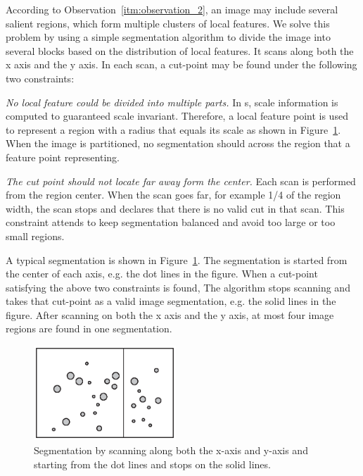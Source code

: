 According to Observation~\ref{itm:observation_2}, an image may include several salient regions, which form multiple clusters of local features. We solve this problem by using a simple segmentation algorithm to divide the image into several blocks based on the distribution of local features. It scans along both the x axis and the y axis. In each scan, a cut-point may be found under the following two constraints:

\squishlist
\item \textit{No local feature could be divided into multiple parts.} In {\lfea}s, scale information is computed to guaranteed scale invariant. Therefore, a local feature point is used to represent a region with a radius that equals its scale as shown in Figure~\ref{fig:segmentation}. When the image is partitioned, no segmentation should across the region that a feature point representing.

\item \textit{The cut point should not locate far away form the center.} Each scan is performed from the region center. When the scan goes far, for example 1/4 of the region width, the scan stops and declares that there is no valid cut in that scan. This constraint attends to keep segmentation balanced and avoid too large or too small regions.
\squishend

A typical segmentation is shown in Figure~\ref{fig:segmentation}. The segmentation is started from the center of each axis, e.g. the dot lines in the figure. When a cut-point satisfying the above two constraints is found, The algorithm stops scanning and takes that cut-point as a valid image segmentation, e.g. the solid lines in the figure. After scanning on both the x axis and the y axis, at most four image regions are found in one segmentation.

\begin{figure}[!ht]
\centering
\includegraphics[width=2.1in]{images/fig-segmentation.eps}
\caption{Segmentation by scanning along both the x-axis and y-axis and starting from the dot lines and stops on the solid lines.}
\label{fig:segmentation}
\end{figure}

